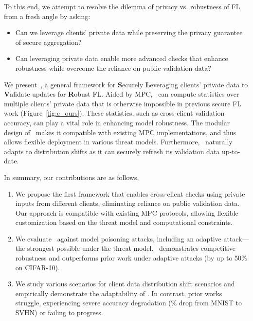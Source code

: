 To this end, we attempt to resolve the dilemma of privacy vs. robustness of FL from a fresh angle by asking:
\begin{tcolorbox}
    \begin{itemize}[leftmargin=*]
        \item Can we leverage clients' private data while preserving the privacy guarantee of secure aggregation?
        \item Can leveraging private data enable more advanced checks that enhance robustness while overcome the reliance on public validation data? 
    \end{itemize}
\end{tcolorbox}
We present~\ours, a general framework for \textbf{S}ecurely \textbf{L}everaging clients' private data to \textbf{V}alidate updates for \textbf{R}obust FL.
Aided by MPC, \ours\ can compute statistics over multiple clients' private data that is otherwise impossible in previous secure FL work (Figure~\ref{fig:c_ours}). These statistics, such as cross-client validation accuracy, can play a vital role in enhancing model robustness.
The modular design of \ours\ makes it compatible with existing MPC implementations, and thus allows flexible deployment in various threat models.
Furthermore, \ours\ naturally adapts to distribution shifts as it can securely refresh its validation data up-to-date.  

In summary, our contributions are as follows,
\begin{enumerate}
    \item We propose the first framework that enables cross-client checks using private inputs from different clients, eliminating reliance on public validation data. Our approach is compatible with existing MPC protocols, allowing flexible customization based on the threat model and computational constraints.
    \item  We evaluate \ours~against model poisoning attacks, including an adaptive attack---the strongest possible under the threat model. \ours~demonstrates competitive robustness and outperforms prior work under adaptive attacks (\eg by up to 50\% on CIFAR-10).
    \item We study various scenarios for client data distribution shift scenarios and empirically demonstrate the adaptability of \ours. In contrast, prior works struggle, experiencing severe accuracy degradation (\% drop from MNIST to SVHN) or failing to progress.
\end{enumerate}









